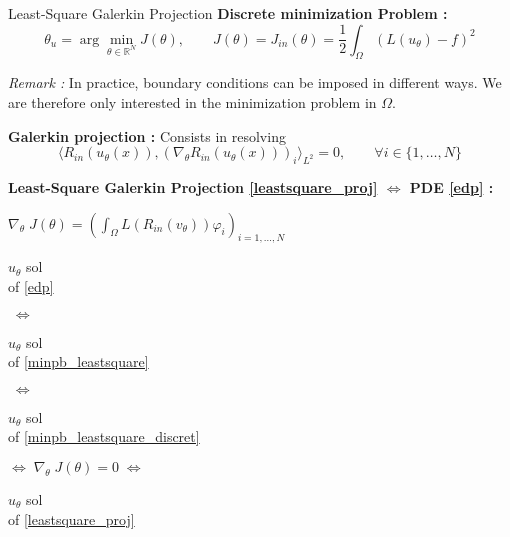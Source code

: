 \begin{frame}{Least-Square Galerkin Projection}
	\textbf{Discrete minimization Problem :}
	\begin{equation}
		\theta_u=\arg\min_{\theta\in\mathbb{R}^N} J(\theta), \qquad J(\theta)=J_{in}(\theta)=\frac{1}{2}\int_\Omega (L(u_\theta) - f)^2 \label{minpb_leastsquare_discret}
	\end{equation}
	
	\footnotesize	
	\textit{Remark :} In practice, boundary conditions can be imposed in different ways. We are therefore only interested in the minimization problem in $\Omega$.
	
	\normalsize	
	
	\textbf{Galerkin projection :} Consists in resolving
	\begin{equation}
		\langle R_{in}(u_\theta(x)),(\nabla_\theta R_{in}(u_\theta(x)))_i\rangle_{L^2}=0, \qquad \forall i\in\{1,\dots,N\}\label{leastsquare_proj}
	\end{equation}
	
	\footnotesize
	\begin{center}
		\begin{tcolorbox}[
			colback=white, %
			colframe=other, %
			arc=2mm, %
			boxrule=0.5pt, %
			breakable, enhanced jigsaw,
			width=\linewidth
			]
			
			\textbf{Least-Square Galerkin Projection \eqref{leastsquare_proj} $\Leftrightarrow$ PDE \eqref{edp} :}
			
			\centering
			$\nabla_\theta \; J(\theta)=\left(\int_\Omega L(R_{in}(v_\theta))\varphi_i\right)_{i=1,\dots,N} \qquad $  
			
			\vspace{5pt}
			
			\begin{minipage}{0.1\linewidth}
				\centering
				$u_\theta$ sol \\
				of \eqref{edp}
			\end{minipage} $\; \Leftrightarrow \;$	\begin{minipage}{0.1\linewidth}
				\centering
				$u_\theta$ sol \\
				of \eqref{minpb_leastsquare}
			\end{minipage} $\; \Leftrightarrow \;$	\begin{minipage}{0.1\linewidth}
				\centering
				$u_\theta$ sol \\
				of \eqref{minpb_leastsquare_discret}
			\end{minipage} $\Leftrightarrow \; \nabla_\theta \; J(\theta)=0 \; \Leftrightarrow$ \begin{minipage}{0.1\linewidth}
				\centering
				$u_\theta$ sol \\
				of \eqref{leastsquare_proj}
			\end{minipage}
			

\end{tcolorbox}
\end{center}
\end{frame}
